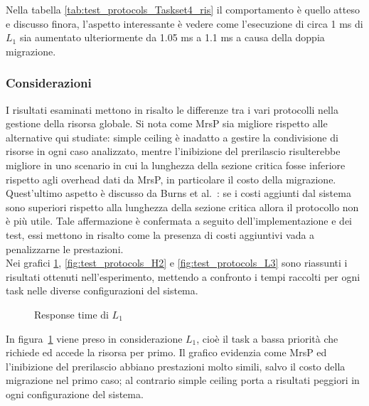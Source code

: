 \noindent Nella tabella \ref{tab:test_protocols_Taskset4_ris} il comportamento è quello atteso e discusso finora, l'aspetto interessante è vedere come l'esecuzione di circa 1 ms di $L_1$ sia aumentato ulteriormente da 1.05 ms a 1.1 ms a causa della doppia migrazione.

\subsubsection{Considerazioni}
\label{sec:confronto_protocolli_cons}

\noindent I risultati esaminati mettono in risalto le differenze tra i vari protocolli nella gestione della risorsa globale. Si nota come MrsP sia migliore rispetto alle alternative qui studiate: simple ceiling è inadatto a gestire la condivisione di risorse in ogni caso analizzato, mentre l'inibizione del prerilascio risulterebbe migliore in uno scenario in cui la lunghezza della sezione critica fosse inferiore rispetto agli overhead dati da MrsP, in particolare il costo della migrazione.\\

\noindent Quest'ultimo aspetto è discusso da Burns et al.~\cite{Burns:2013:SCM:2547348.2547350}: se i costi aggiunti dal sistema sono superiori rispetto alla lunghezza della sezione critica allora il protocollo non è più utile. Tale affermazione è confermata a seguito dell'implementazione e dei test, essi mettono in risalto come la presenza di costi aggiuntivi vada a penalizzarne le prestazioni.\\

\noindent Nei grafici \ref{fig:test_protocols_L1}, \ref{fig:test_protocols_H2} e \ref{fig:test_protocols_L3} sono riassunti i risultati ottenuti nell'esperimento, mettendo a confronto i tempi raccolti per ogni task nelle diverse configurazioni del sistema.\\

\begin{figure}
  \centering
  \confrontoProtocolliLUno
  \caption{Response time di $L_1$}
  \label{fig:test_protocols_L1}
\end{figure}

\noindent In figura~\ref{fig:test_protocols_L1} viene preso in considerazione $L_1$, cioè il task a bassa priorità che richiede ed accede la risorsa per primo. Il grafico evidenzia come MrsP ed l'inibizione del prerilascio abbiano prestazioni molto simili, salvo il costo della migrazione nel primo caso; al contrario simple ceiling porta a risultati peggiori in ogni configurazione del sistema.\\

